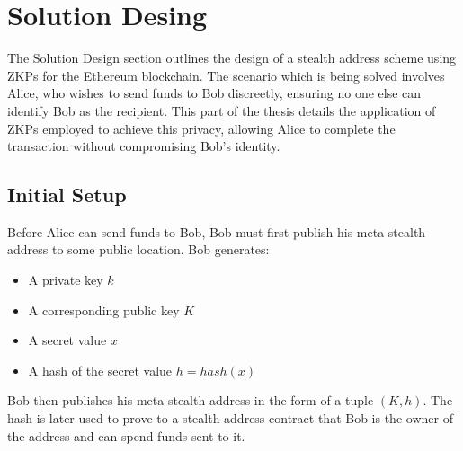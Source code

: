 \chapter{Solution Desing}

The Solution Design section outlines the design of a stealth address
scheme using ZKPs for the Ethereum blockchain. The scenario which is being
solved involves Alice, who wishes to send funds to Bob discreetly, ensuring no
one else can identify Bob as the recipient. This part of the thesis details
the application of ZKPs employed to achieve this privacy, allowing Alice to
complete the transaction without compromising Bob's identity.

\section{Initial Setup}

Before Alice can send funds to Bob, Bob must first publish his meta stealth
address to some public location. Bob generates:

\begin{itemize}
	\item A private key $k$
	\item A corresponding public key $K$
	\item A secret value $x$
	\item A hash of the secret value $h = hash(x)$
\end{itemize}

Bob then publishes his meta stealth address in the form of a tuple $(K, h)$.
The hash is later used to prove to a stealth address contract that Bob is the
owner of the address and can spend funds sent to it.



